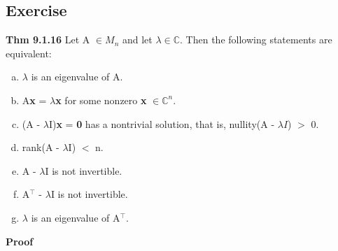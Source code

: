 \documentclass[12pt, letterpaper]{article}
\begin{document}
\subsection{Exercise}
\textbf{Thm 9.1.16} Let A $\in M_n$ and let $\lambda \in \mathbb{C}$. Then the following statements are equivalent:
\begin{enumerate}[(a)]
    \item $\lambda$ is an eigenvalue of A.
    \item A\textbf{x} = $\lambda$\textbf{x} for some nonzero \textbf{x} $\in \mathbb{C}^n$.
    \item (A - $\lambda$I)\textbf{x} = \textbf{0} has a nontrivial solution, that is, nullity(A - $\lambda I$) $>$ 0.
    \item rank(A - $\lambda$I) $<$ n.
    \item A - $\lambda$I is not invertible.
    \item A$^\top$ - $\lambda$I is not invertible.
    \item $\lambda$ is an eigenvalue of A$^\top$.
\end{enumerate}
\textbf{Proof}
\end{document}
